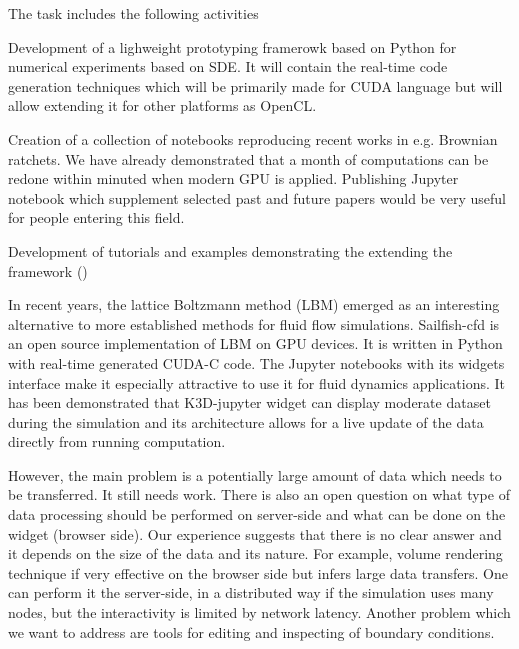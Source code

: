 \begin{task}[
  title=Application: Reproducible research based on GPU,
  id=application-gpu,
  lead=SIL,
  PM=12,
  wphases={4-36},
  partners={}
]
  The task includes the following activities
  \begin{compactitem}
  \item Development of a lighweight prototyping framerowk based on Python for numerical experiments based on SDE. It will contain the real-time code generation techniques which will be primarily made for CUDA language but will allow extending it for other platforms as OpenCL. 
  \item Creation of a collection of notebooks reproducing recent works in e.g. Brownian ratchets. We have already demonstrated \cite{januszewski2010accelerating,spiechowicz2015gpu} that a month of computations can be redone within minuted when modern GPU is applied. Publishing Jupyter notebook which supplement selected past and future papers would be very useful for people entering this field.  
  \item Development of tutorials and examples demonstrating the extending the framework
    ()
  \end{compactitem}
  
In recent years, the lattice Boltzmann method (LBM) emerged as an interesting alternative to more established methods for fluid flow simulations. Sailfish-cfd \cite{januszewski2014sailfish} is an open source implementation of LBM on GPU devices. It is written in Python with real-time generated CUDA-C code. The Jupyter notebooks with its widgets interface make it especially attractive to use it for fluid dynamics applications. It has been demonstrated that K3D-jupyter widget can display moderate dataset during the simulation and its architecture allows for a live update of the data directly from running computation.   

However, the main problem is a potentially large amount of data which needs to be transferred. It still needs work. There is also an open question on what type of data processing should be performed on server-side and what can be done on the widget (browser side). Our experience suggests that there is no clear answer and it depends on the size of the data and its nature. For example, volume rendering technique if very effective on the browser side but infers large data transfers. One can perform it the server-side, in a distributed way if the simulation uses many nodes, but the interactivity is limited by network latency. Another problem which we want to address are tools for editing and inspecting of boundary conditions. 


\end{task}

